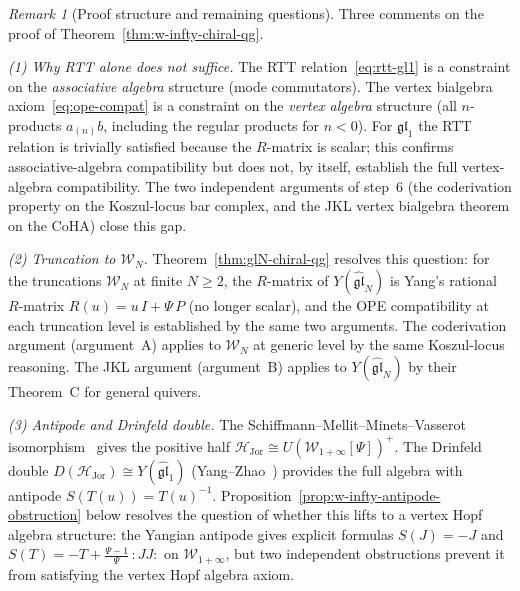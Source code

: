 \documentclass[11pt,reqno]{amsart}
\theoremstyle{definition}
\theoremstyle{remark}
\newtheorem{remark}[theorem]{Remark}
\newcommand{\cH}{\mathcal{H}}
\newcommand{\cW}{\mathcal{W}}
\numberwithin{equation}{section}
\begin{document}
\begin{remark}[Proof structure and remaining questions]
\label{rem:w-infty-vertex-gap}
Three comments on the proof of
Theorem~\textup{\ref{thm:w-infty-chiral-qg}}.

\smallskip
\noindent\emph{(1) Why RTT alone does not suffice.}
The RTT relation~\eqref{eq:rtt-gl1} is a constraint on the
\emph{associative algebra} structure (mode commutators).
The vertex bialgebra axiom~\eqref{eq:ope-compat} is a
constraint on the \emph{vertex algebra} structure (all
$n$-products $a_{(n)}b$, including the regular products for
$n < 0$). For $\mathfrak{gl}_1$ the RTT relation is
trivially satisfied because the $R$-matrix is scalar; this
confirms associative-algebra compatibility but does not, by
itself, establish the full vertex-algebra compatibility.
The two independent arguments of step~6 (the
coderivation property on the Koszul-locus bar complex, and
the JKL vertex bialgebra theorem on the CoHA) close this
gap.

\smallskip
\noindent\emph{(2) Truncation to $\cW_N$.}
Theorem~\ref{thm:glN-chiral-qg} resolves this question:
for the truncations $\cW_N$ at finite $N \geq 2$, the
$R$-matrix of $Y(\widehat{\mathfrak{gl}}_N)$ is Yang's
rational $R$-matrix $R(u) = u\, I + \Psi\, P$ (no longer
scalar), and the OPE compatibility at each truncation level
is established by the same two arguments.
The coderivation argument (argument~A) applies to
$\cW_N$ at generic level by the same Koszul-locus reasoning.
The JKL argument (argument~B) applies to
$Y(\widehat{\mathfrak{gl}}_N)$ by their Theorem~C for
general quivers.

\smallskip
\noindent\emph{(3) Antipode and Drinfeld double.}
The Schiffmann--Mellit--Minets--Vasserot
isomorphism~\cite{SMMV23} gives the positive half
$\cH_{\mathrm{Jor}} \cong U(\cW_{1+\infty}[\Psi])^+$.
The Drinfeld double
$D(\cH_{\mathrm{Jor}}) \cong
Y(\widehat{\mathfrak{gl}}_1)$ (Yang--Zhao~\cite{YZ18a})
provides the full algebra with antipode
$S(T(u)) = T(u)^{-1}$.
Proposition~\ref{prop:w-infty-antipode-obstruction} below
resolves the question of whether this lifts to a
vertex Hopf algebra structure: the Yangian antipode gives
explicit formulas $S(J) = -J$ and
$S(T) = -T + \tfrac{\Psi - 1}{\Psi}\,{:}JJ{:}$ on
$\cW_{1+\infty}$, but two independent obstructions prevent
it from satisfying the vertex Hopf algebra axiom.
\end{remark}
\end{document}
